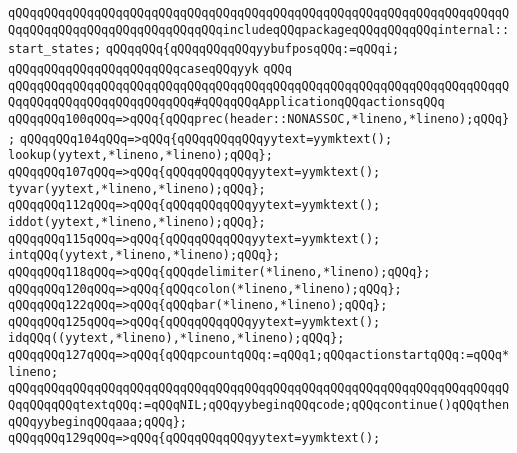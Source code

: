 \verb|qQQqqQQqqQQqqQQqqQQqqQQqqQQqqQQqqQQqqQQqqQQqqQQqqQQqqQQqqQQqqQQqqQQqqQQqqQQqqQQqqQQqqQQqqQQqqQQqqQQqincludeqQQqpackageqQQqqQQqqQQqinternal::start_states;|\newline
\verb|qQQqqQQq{qQQqqQQqqQQqyybufposqQQq:=qQQqi;|\newline
\verb|qQQqqQQqqQQqqQQqqQQqqQQqcaseqQQqyyk|\newline
\verb|qQQq|\newline
\newline
\verb|qQQqqQQqqQQqqQQqqQQqqQQqqQQqqQQqqQQqqQQqqQQqqQQqqQQqqQQqqQQqqQQqqQQqqQQqqQQqqQQqqQQqqQQqqQQqqQQq#qQQqqQQqApplicationqQQqactionsqQQq|\newline
\newline
\verb|qQQqqQQq100qQQq=>qQQq{qQQqprec(header::NONASSOC,*lineno,*lineno);qQQq};|\newline
\verb|qQQqqQQq104qQQq=>qQQq{qQQqqQQqqQQqyytext=yymktext();|\newline
\verb|lookup(yytext,*lineno,*lineno);qQQq};|\newline
\verb|qQQqqQQq107qQQq=>qQQq{qQQqqQQqqQQqyytext=yymktext();|\newline
\verb|tyvar(yytext,*lineno,*lineno);qQQq};|\newline
\verb|qQQqqQQq112qQQq=>qQQq{qQQqqQQqqQQqyytext=yymktext();|\newline
\verb|iddot(yytext,*lineno,*lineno);qQQq};|\newline
\verb|qQQqqQQq115qQQq=>qQQq{qQQqqQQqqQQqyytext=yymktext();|\newline
\verb|intqQQq(yytext,*lineno,*lineno);qQQq};|\newline
\verb|qQQqqQQq118qQQq=>qQQq{qQQqdelimiter(*lineno,*lineno);qQQq};|\newline
\verb|qQQqqQQq120qQQq=>qQQq{qQQqcolon(*lineno,*lineno);qQQq};|\newline
\verb|qQQqqQQq122qQQq=>qQQq{qQQqbar(*lineno,*lineno);qQQq};|\newline
\verb|qQQqqQQq125qQQq=>qQQq{qQQqqQQqqQQqyytext=yymktext();|\newline
\verb|idqQQq((yytext,*lineno),*lineno,*lineno);qQQq};|\newline
\verb|qQQqqQQq127qQQq=>qQQq{qQQqpcountqQQq:=qQQq1;qQQqactionstartqQQq:=qQQq*lineno;|\newline
\verb|qQQqqQQqqQQqqQQqqQQqqQQqqQQqqQQqqQQqqQQqqQQqqQQqqQQqqQQqqQQqqQQqqQQqqQQqqQQqqQQqtextqQQq:=qQQqNIL;qQQqyybeginqQQqcode;qQQqcontinue()qQQqthenqQQqyybeginqQQqaaa;qQQq};|\newline
\verb|qQQqqQQq129qQQq=>qQQq{qQQqqQQqqQQqyytext=yymktext();|\newline
